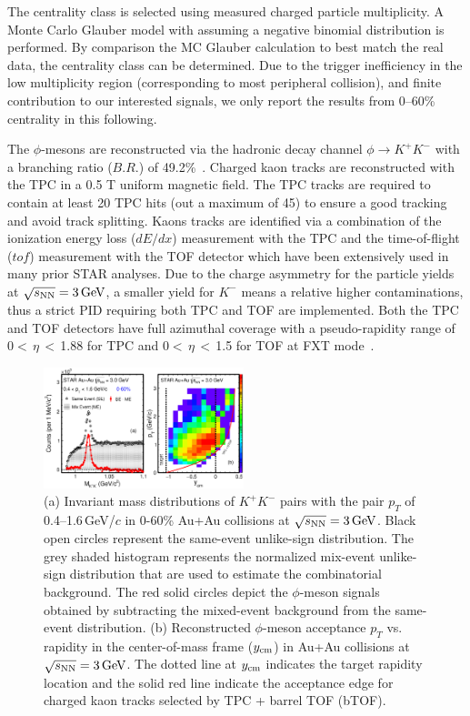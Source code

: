 \documentclass[%
 reprint,	
showpacs,
 amsmath,amssymb,
 aps,
 prc,
]{revtex4-1}
\begin{document}
The centrality class is selected using measured charged particle multiplicity. A Monte Carlo Glauber model with assuming a negative binomial distribution is performed. By comparison the MC Glauber calculation to best match the real data, the centrality class can be determined. Due to the trigger inefficiency in the low multiplicity region (corresponding to most peripheral collision), and finite contribution to our interested signals, we only report the results from 0--60\% centrality in this following.

The $\phi$-mesons are reconstructed via the hadronic decay channel $\phi\rightarrow K^+K^-$ with a branching ratio ($B.R.$) of 49.2\%~\cite{pdg}. Charged kaon tracks are reconstructed with the TPC in a 0.5 T uniform magnetic field. The TPC tracks are required to contain at least 20 TPC hits (out a maximum of 45) to ensure a good tracking and avoid track splitting. Kaons tracks are identified via a combination of the ionization energy loss ($dE/dx$) measurement with the TPC and the time-of-flight ($tof$) measurement with the TOF detector which have been extensively used in many prior STAR analyses. Due to the charge asymmetry for the particle yields at ${\sqrt{s_{\rm NN}} = \rm{3\,GeV}}$, a smaller yield for $K^-$ means a relative higher contaminations, thus a strict PID requiring both TPC and TOF are implemented. Both the TPC and TOF detectors have full azimuthal coverage with a pseudo-rapidity range of 0$<$\,$\eta$\,$<$\,1.88 for TPC and 0$<$\,$\eta$\,$<$\,1.5 for TOF at FXT mode~\cite{TPC,TOF}.



\begin{figure}
\centering
\includegraphics[width=0.52\textwidth]{fig/fig1_signal.eps}
  \caption{(a) Invariant mass distributions of $K^+K^-$ pairs with the pair $p_T$ of 0.4--1.6\,GeV/$c$ in 0-60\% Au+Au collisions at ${\sqrt{s_{\rm NN}} = \rm{3\,GeV}}$. Black open circles represent the same-event unlike-sign distribution. The grey shaded histogram represents the normalized mix-event unlike-sign distribution that are used to estimate the combinatorial background. The red solid circles depict the $\phi$-meson signals obtained by subtracting the mixed-event background from the same-event distribution. (b) Reconstructed $\phi$-meson acceptance $p_T$ vs. rapidity in the center-of-mass frame ($y_{\rm cm}$) in Au+Au collisions at ${\sqrt{s_{\rm NN}} = \rm{3\,GeV}}$. The dotted line at $y_{\rm cm}$ indicates the target rapidity location and the solid red line indicate the acceptance edge for charged kaon tracks selected by TPC + barrel TOF (bTOF).}
\label{fig:phiSignal} 
\end{figure}
\end{document}
